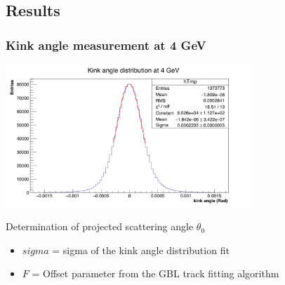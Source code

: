\documentclass{beamer}
\begin{document}
  \subsection{Results}

  \begin{frame}
    \frametitle{Kink angle measurement at 4 GeV}

      \begin{center}
        \includegraphics[width = 0.7\textwidth]{Pictures/kinkAngle4GeV.png}
      \end{center}
      \vspace{-0.2cm}
      \begin{block}{Determination of projected scattering angle $\theta_0$}
        \begin{itemize}
          \item $sigma$ = sigma of the kink angle distribution fit
          \item $F$ = Offset parameter from the GBL track fitting algorithm
        \end{itemize}
      \end{block}
  \end{frame}
\end{document}
